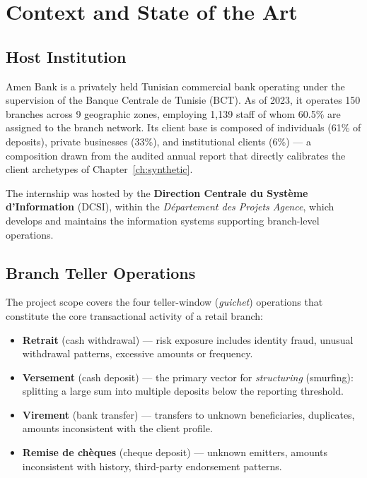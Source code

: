\chapter{Context and State of the Art}
\label{ch:context}

\section{Host Institution}

Amen Bank is a privately held Tunisian commercial bank operating under the supervision of the Banque Centrale de Tunisie (BCT). As of 2023, it operates 150 branches across 9 geographic zones, employing 1{,}139 staff of whom 60.5\% are assigned to the branch network. Its client base is composed of individuals (61\% of deposits), private businesses (33\%), and institutional clients (6\%) --- a composition drawn from the audited annual report that directly calibrates the client archetypes of Chapter~\ref{ch:synthetic}.

The internship was hosted by the \textbf{Direction Centrale du Syst\`eme d'Information} (DCSI), within the \emph{D\'epartement des Projets Agence}, which develops and maintains the information systems supporting branch-level operations.

\section{Branch Teller Operations}

The project scope covers the four teller-window (\emph{guichet}) operations that constitute the core transactional activity of a retail branch:

\begin{itemize}
  \item \textbf{Retrait} (cash withdrawal) --- risk exposure includes identity fraud, unusual withdrawal patterns, excessive amounts or frequency.
  \item \textbf{Versement} (cash deposit) --- the primary vector for \emph{structuring} (smurfing): splitting a large sum into multiple deposits below the reporting threshold.
  \item \textbf{Virement} (bank transfer) --- transfers to unknown beneficiaries, duplicates, amounts inconsistent with the client profile.
  \item \textbf{Remise de ch\`eques} (cheque deposit) --- unknown emitters, amounts inconsistent with history, third-party endorsement patterns.
\end{itemize}

